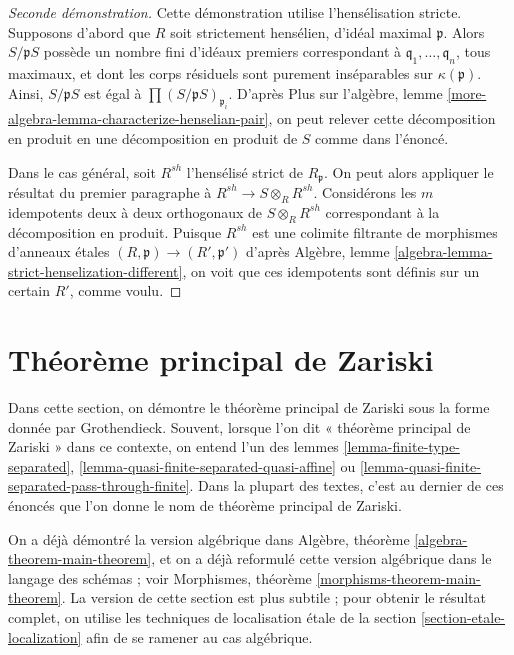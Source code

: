 \begin{proof}[Seconde démonstration]
Cette démonstration utilise l'hensélisation stricte. Supposons d'abord que $R$ soit strictement
hensélien, d'idéal maximal $\mathfrak p$. Alors $S/\mathfrak p S$
possède un nombre fini d'idéaux premiers correspondant à
$\mathfrak q_1, \ldots, \mathfrak q_n$, tous maximaux,
et dont les corps résiduels sont purement inséparables sur $\kappa(\mathfrak p)$.
Ainsi, $S/\mathfrak p S$ est égal à $\prod (S/\mathfrak p S)_{\mathfrak p_i}$.
D'après Plus sur l'algèbre, lemme \ref{more-algebra-lemma-characterize-henselian-pair},
on peut relever cette décomposition en produit en une décomposition en produit de $S$
comme dans l'énoncé.

\medskip\noindent
Dans le cas général, soit $R^{sh}$ l'hensélisé strict de
$R_\mathfrak p$. On peut alors appliquer le résultat du premier paragraphe
à $R^{sh} \to S \otimes_R R^{sh}$. Considérons les $m$ idempotents deux à deux orthogonaux
de $S \otimes_R R^{sh}$ correspondant à la décomposition en produit.
Puisque $R^{sh}$ est une colimite filtrante de morphismes d'anneaux \'etales
$(R, \mathfrak p) \to (R', \mathfrak p')$ d'après
Algèbre, lemme \ref{algebra-lemma-strict-henselization-different},
on voit que ces idempotents sont définis sur un certain $R'$, comme voulu.
\end{proof}







\section{Théorème principal de Zariski}
\label{section-application-etale-neighbourhoods}

\noindent
Dans cette section, on démontre le théorème principal de Zariski sous la forme donnée par Grothendieck.
Souvent, lorsque l'on dit « théorème principal de Zariski » dans ce contexte, on entend l'un des
lemmes \ref{lemma-finite-type-separated},
\ref{lemma-quasi-finite-separated-quasi-affine} ou
\ref{lemma-quasi-finite-separated-pass-through-finite}.
Dans la plupart des textes, c'est au dernier de ces énoncés que l'on donne le nom de
théorème principal de Zariski.

\medskip\noindent
On a déjà démontré la version algébrique dans
Algèbre, théorème \ref{algebra-theorem-main-theorem},
et on a déjà reformulé cette version algébrique
dans le langage des schémas ; voir
Morphismes, théorème \ref{morphisms-theorem-main-theorem}.
La version de cette section est plus subtile ; pour obtenir le résultat
complet, on utilise les techniques de localisation \'etale
de la section \ref{section-etale-localization} afin de se ramener au
cas algébrique.

